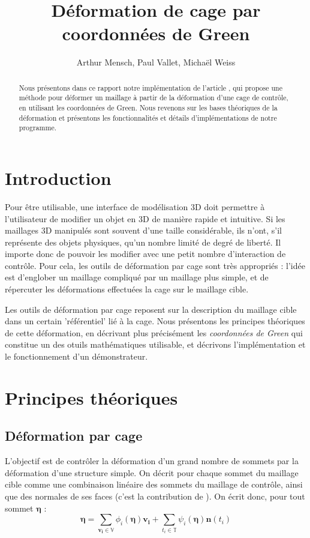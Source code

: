 \documentclass[10pt,a4paper]{article}
\author{Arthur Mensch, Paul Vallet, Michaël Weiss}
\title{Déformation de cage par coordonnées de Green}
\begin{document}
\maketitle
\begin{abstract}
Nous présentons dans ce rapport notre implémentation de l'article \cite{lipman2008green}, qui propose une méthode pour déformer un maillage à partir de la déformation d'une cage de contrôle, en utilisant les coordonnées de Green. Nous revenons sur les bases théoriques de la déformation et présentons les fonctionnalités et détails d'implémentations de notre programme.
\end{abstract}
\section*{Introduction}

Pour être utilisable, une interface de modélisation 3D doit permettre à l'utilisateur de modifier un objet en 3D de manière rapide et intuitive. Si les maillages 3D manipulés sont souvent d'une taille considérable, ils n'ont, s'il représente des objets physiques, qu'un nombre limité de degré de liberté. Il importe donc de pouvoir les modifier avec une petit nombre d'interaction de contrôle. Pour cela, les outils de déformation par cage sont très appropriés : l'idée est d'englober un maillage compliqué par un maillage plus simple, et de répercuter les déformations effectuées la cage sur le maillage cible. 

Les outils de déformation par cage reposent sur la description du maillage cible dans un certain 'référentiel' lié à la cage. Nous présentons les principes théoriques de cette déformation, en décrivant plus précisément les \textit{coordonnées de Green} qui constitue un des otuils mathématiques utilisable, et décrivons l'implémentation et le fonctionnement d'un démonstrateur. 

\section{Principes théoriques}
\label{section:theory}

\subsection{Déformation par cage}

L'objectif est de contrôler la déformation d'un grand nombre de sommets par la déformation d'une structure simple. On décrit pour chaque sommet du maillage cible comme une combinaison linéaire des sommets du maillage de contrôle, ainsi que des normales de ses faces (c'est la contribution de \cite{lipman2008green}). On écrit donc, pour tout sommet $\mathbf{\eta}$ :
\begin{equation}
\label{eq:linear}
\mathbf{\eta} = \sum_{\mathbf{v_i} \in \mathbb{V}} \phi_i \left( \mathbf{\eta} \right) \mathbf{v_i} 
+ \sum_{t_i \in \mathbb{T}} \psi_i \left( \mathbf{\eta} \right) \mathbf{n} \left( t_i \right)
\end{equation}
\end{document}
